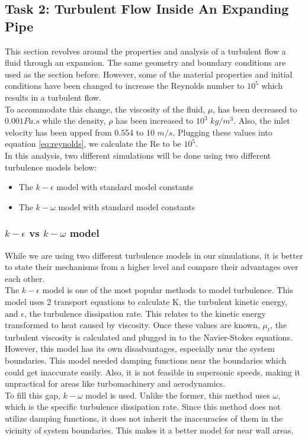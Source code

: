 \subsection{Task 2: Turbulent Flow Inside An Expanding Pipe}
\label{sec:task2}

This section revolves around the properties and analysis of a turbulent flow a fluid through an expansion. The same geometry and boundary conditions are used as the section before. However, some of the material properties and initial conditions have been changed to increase the Reynolds number to $10^5$ which results in a turbulent flow.\\

\noindent To accommodate this change, the viscosity of the fluid, $\mu$, has been decreased to $0.001 Pa.s$ while the density, $\rho$ has been increased to $10^3$ $kg/m^{3}$. Also, the inlet velocity has been upped from 0.554 to 10 $m/s$. Plugging these values into equation \ref{eq:reynolds}, we calculate the Re to be $10^5$. \\


\noindent In this analysis, two different simulations will be done using two different turbulence models below:
\begin{itemize}
    \item The $k - \epsilon$ model with standard model constants
    \item The $k - \omega$ model with standard model constants
\end{itemize}

\subsubsection{$k - \epsilon$ vs $k - \omega$ model}

While we are using two different turbulence models in our simulations, it is better to state their mechanisms from a higher level and compare their advantages over each other.\\

\noindent The $k-\epsilon$ model is one of the most popular methods to model turbulence. This model uses 2 transport equations to calculate K, the turbulent kinetic energy, and $\epsilon$, the turbulence dissipation rate. This relates to the kinetic energy transformed to heat caused by viscosity. Once these values are known, $\mu_t$, the turbulent viscosity is calculated and plugged in to the Navier-Stokes equations.\\

\noindent However, this model has its own disadvantages, especially near the system boundaries. This model needed damping functions near the boundaries which could get inaccurate easily. Also, it is not feasible in supersonic speeds, making it unpractical for areas like turbomachinery and aerodynamics. \\

\noindent To fill this gap, $k-\omega$ model is used. Unlike the former, this method uses $\omega$, which is the specific turbulence dissipation rate. Since this method does not utilize damping functions, it does not inherit the inaccuracies of them in the vicinity of system boundaries. This makes it a better model for near wall areas.
